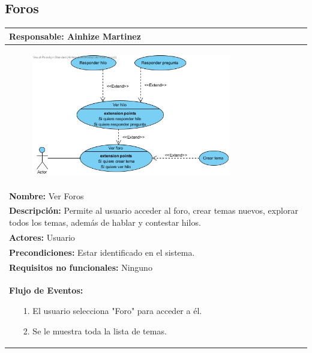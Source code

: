 \documentclass{report}
\begin{document}
        \subsection{Foros}
        \begin{center}
                \begin{longtable}{|p{\linewidth}|}
                    \hline
                    \textbf{Responsable:} Ainhize Martinez\\
                    \hline
                    \begin{figure}[H]
                        \centering
                        \includegraphics[width=0.8\textwidth]{./img/casos_uso/casos_foro.jpg}
                    \end{figure}\\
                    \hline
                    \textbf{Nombre:} Ver Foros\\
                    \hline
                    \textbf{Descripción:} Permite al usuario acceder al foro, crear temas nuevos, explorar todos los temas, además de hablar y contestar hilos.\\
                    \hline
                    \textbf{Actores:} Usuario\\
                    \hline
                    \textbf{Precondiciones:} Estar identificado en el sistema.\\
                    \hline
                    \textbf{Requisitos no funcionales:} Ninguno\\
                    \hline
                    \textbf{Flujo de Eventos:}
                    \begin{enumerate}
                        \item[1.] El usuario selecciona "Foro" para acceder a él.
                        \item[2.] Se le muestra toda la lista de temas.
                        \newline

\end{enumerate}
\end{longtable}
\end{center}
\end{document}
